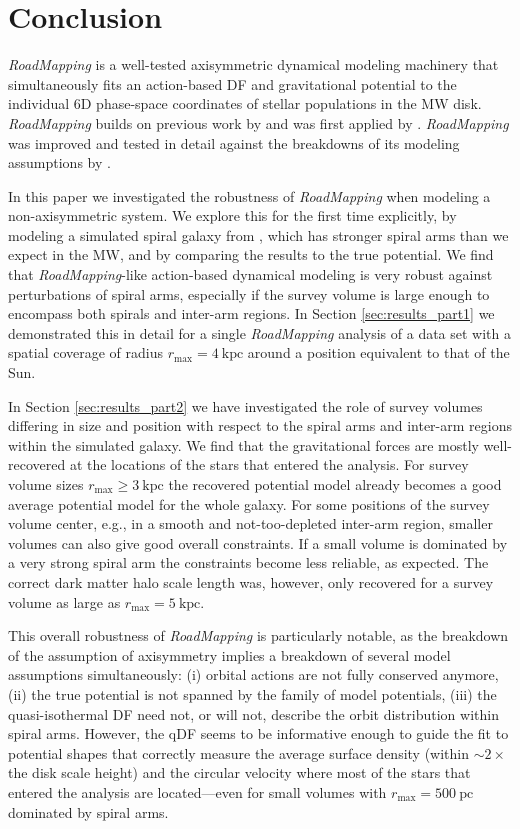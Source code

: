 \documentclass[iop,revtex4,numberedappendix,appendixfloats]{emulateapj}
\newcommand{\RM}{{\sl RoadMapping}}
\begin{document}
\section{Conclusion} \label{sec:conclusion}

\RM{} is a well-tested axisymmetric dynamical modeling machinery that simultaneously fits an action-based DF and gravitational potential to the individual 6D phase-space coordinates of stellar populations in the MW disk. \RM{} builds on previous work by \citet{2011MNRAS.413.1889B,2012MNRAS.426.1324B,2015ApJS..216...29B} and was first applied by \citet{2013ApJ...779..115B}. \RM{} was improved and tested in detail against the breakdowns of its modeling assumptions by \citet{2016ApJ...830...97T}. 

In this paper we investigated the robustness of \RM{} when modeling a non-axisymmetric system. We explore this for the first time explicitly, by modeling a simulated spiral galaxy from \citet{2013ApJ...766...34D}, which has stronger spiral arms than we expect in the MW, and by comparing the results to the true potential. We find that \RM{}-like action-based dynamical modeling is very robust against perturbations of spiral arms, especially if the survey volume is large enough to encompass both spirals and inter-arm regions. In Section \ref{sec:results_part1} we demonstrated this in detail for a single \RM{} analysis of a data set with a spatial coverage of radius $r_\text{max}=4~\text{kpc}$ around a position equivalent to that of the Sun.

In Section \ref{sec:results_part2} we have investigated the role of survey volumes differing in size and position with respect to the spiral arms and inter-arm regions within the simulated galaxy. We find that the gravitational forces are mostly well-recovered at the locations of the stars that entered the analysis. For survey volume sizes $r_\text{max} \geq 3~\text{kpc}$ the recovered potential model already becomes a good average potential model for the whole galaxy. For some positions of the survey volume center, e.g., in a smooth and not-too-depleted inter-arm region, smaller volumes can also give good overall constraints. If a small volume is dominated by a very strong spiral arm the constraints become less reliable, as expected. The correct dark matter halo scale length was, however, only recovered for a survey volume as large as $r_\text{max}=5~\text{kpc}$. 

This overall robustness of \RM{} is particularly notable, as the breakdown of the assumption of axisymmetry implies a breakdown of several model assumptions simultaneously: (i) orbital actions are not fully conserved anymore, (ii) the true potential is not spanned by the family of model potentials, (iii) the quasi-isothermal DF need not, or will not, describe the orbit distribution within spiral arms. However, the qDF seems to be informative enough to guide the fit to potential shapes that correctly measure the average surface density (within $\sim2 \times$ the disk scale height) and the circular velocity where most of the stars that entered the analysis are located---even for small volumes with $r_\text{max}=500~\text{pc}$ dominated by spiral arms. 
\end{document}
